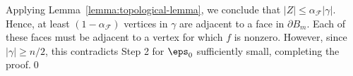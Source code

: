 Applying Lemma~\ref{lemma:topological-lemma}, we conclude that $|Z| \leq \alpha_{\mathcal{F}} |\gamma|$.
Hence, at least $(1- \alpha_{\mathcal{F}} )$ vertices in $\gamma$ are adjacent to a face in $\partial B_{m}$.
Each of these faces must be adjacent to a vertex for which $f$ is nonzero.
However, since $|\gamma| \geq n/2$, this contradicts Step 2 for $\eps_0$ sufficiently small, completing the proof.\qed
